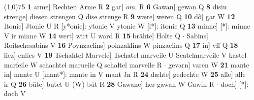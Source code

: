 \documentclass[8pt,a4paper,notitlepage]{article}
\begin{document}
\begin{table}[ht]
\begin{minipage}[t]{0.5\linewidth}
\line(1,0){75} \newline
\textbf{1} arme] Rechten Arme R \textbf{2} gar] \textit{om.} R \textbf{6} Gawan] gewan Q \textbf{8} disiu strenge] diesen strengen Q dise strenge R \textbf{9} wære] weren Q \textbf{10} dô] gar W \textbf{12} Itonie] Jtonie U R [y*onie]: ytonie V ytonie W [i*]: itonie Q \textbf{13} minne] [*]: minne V ir minne W \textbf{14} wert] wirt U ward R \textbf{15} brâhte] Holte Q  $\cdot$ Sabins] Roitschesabins V \textbf{16} Poynzaclins] poinzaklins W pinzaclins Q \textbf{17} in] vff Q \textbf{18} liez] enlies V \textbf{19} Tschahtel Marvele] Tschatel marveile U Scatelmarveile V kastel marfeile W schachtel marueile Q schaltel marveile R  $\cdot$ gevarn] varen W \textbf{21} mante in] mante U [mant*]: mante in V mant Jn R \textbf{24} dæhte] gedechte W \textbf{25} alle] alle ir Q \textbf{26} büte] butet U (W) bút R \textbf{28} Gawane] her gawan W Gawin R  $\cdot$ doch] [*]: doch V \newline
\end{minipage}
\end{table}
\end{document}
